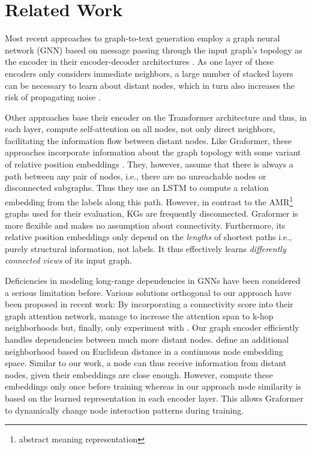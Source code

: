 \documentclass[11pt]{article}
\begin{document}
\section{Related Work}

Most recent approaches to graph-to-text generation
employ a graph neural network (GNN) based on message passing through the input graph's topology
as the encoder in their encoder-decoder architectures \citep{marcheggiani-perez-beltrachini-2018-deep,koncel-kedziorski-etal-2019-text,ribeiro-etal-2019-enhancing,guo-etal-2019-densely}.
As one layer of these encoders only considers immediate neighbors,
a large number of stacked layers can be necessary to learn about distant nodes,
which in turn also increases the risk of propagating noise \citep{li18}.

Other approaches \citep{zhu-etal-2019-modeling,cai20} base their encoder on the Transformer architecture \citep{vaswani17}
and thus, in each layer, compute self-attention on all nodes, not only direct neighbors,
facilitating the information flow between distant nodes.
Like Graformer, these approaches incorporate information about the graph topology with some variant of relative position embeddings \citep{shaw-etal-2018-self}.
They, however, assume that there is always a path between any pair of nodes, i.e., there are no unreachable nodes or disconnected subgraphs.
Thus they use an LSTM \citep{lstm} to compute a relation embedding from the
labels along this path.
However, in contrast to the AMR\footnote{abstract meaning representation} graphs used for their evaluation,
KGs are frequently disconnected.
Graformer is more flexible and makes no assumption about connectivity.
Furthermore, its relative position embeddings only depend on the \textit{lengths} of shortest paths
i.e., purely structural information, not labels.
It thus effectively learns \textit{differently connected views} of its input graph.

Deficiencies in modeling long-range dependencies in GNNs
have been considered a serious limitation before.
Various solutions orthogonal to our approach have been proposed in recent work:
By incorporating a connectivity score into their graph attention network,
\citet{zhang20} manage to increase the attention span to k-hop neighborhoods
but, finally, only experiment with .
Our graph encoder efficiently handles dependencies between much more distant nodes.
\citet{pei20} define an additional neighborhood
based on Euclidean distance in a continuous node embedding space.
Similar to our work,
a node can thus receive information from distant nodes,
given their embeddings are close enough.
However, \citet{pei20} compute these embeddings only once before training
whereas in our approach
node similarity is based on the learned representation in each encoder layer.
This allows Graformer to dynamically change node interaction patterns during training.
\end{document}
